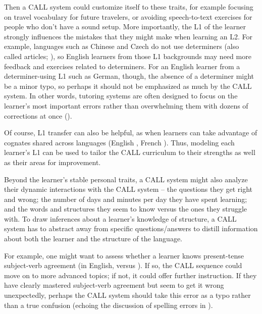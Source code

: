 Then a CALL system could customize itself to these traits, for example focusing on travel vocabulary for future travelers, or avoiding speech-to-text exercises for people who don't have a sound setup.  More importantly, the L1 of the learner strongly influences the mistakes that they might make when learning an L2.  For example, languages such as Chinese and Czech do not use determiners (also called articles; ), so English learners from those L1 backgrounds may need more feedback and exercises related to determiners.  For an English learner from a determiner-using L1 such as German, though, the absence of a determiner might be a minor typo, so perhaps it should not be emphasized as much by the CALL system. In other words, tutoring systems are often designed to focus on the learner's most important errors rather than overwhelming them with dozens of corrections at once ().

Of course,  L1 transfer can also be helpful, as when learners can take advantage of cognates shared across languages (English , French ).   Thus, modeling each learner's L1 can be used to tailor the CALL curriculum to their strengths as well as their areas for improvement.



Beyond the learner's stable personal traits, a CALL system might also analyze their dynamic interactions with the CALL system -- the questions they get right and wrong; the number of days and minutes per day they have spent learning; and the words and structures they seem to know versus the ones they struggle with.  To draw inferences about a learner's knowledge of structure, a CALL system has to abstract away from specific questions/answers to distill information about both the learner and the structure of the language. 

For example, one might want to assess whether a learner knows present-tense subject-verb agreement (in English,  versus ).  If so,  the CALL sequence could move on to more advanced topics; if not, it could offer further instruction.  If they have clearly mastered subject-verb agreement but seem to get it wrong unexpectedly, perhaps the CALL system should take this error as a typo rather than a true confusion (echoing the discussion of spelling errors in ).  

